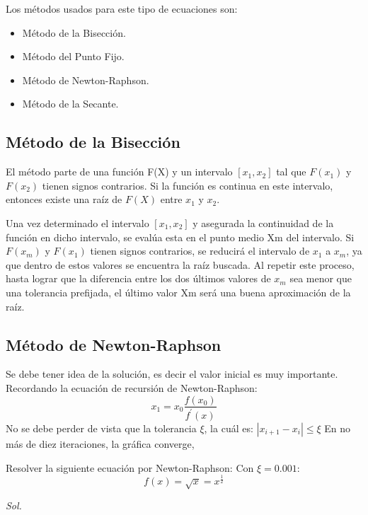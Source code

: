 Los métodos usados para este tipo de ecuaciones son:
\begin{itemize}
    \item Método de la Bisección.
    \item Método del Punto Fijo.
    \item Método de Newton-Raphson.
    \item Método de la Secante.
\end{itemize}

\subsection{Método de la Bisección}
El método parte de una función F(X) y un intervalo $[x_1,x_2]$ tal que $F(x_1)$ y $F(x_2)$ tienen signos contrarios. Si la función es continua en este intervalo, entonces existe una raíz de $F(X)$ entre $x_1$ y $x_2$.

Una vez determinado el intervalo $[x_1,x_2]$ y asegurada la continuidad de la función en dicho intervalo, se evalúa esta en el punto medio Xm del intervalo. Si $F(x_m)$ y $F(x_1)$ tienen signos contrarios, se reducirá el intervalo de $x_1$ a $x_m$, ya que dentro de estos valores se encuentra la raíz buscada. Al repetir este proceso, hasta lograr que la diferencia entre los dos últimos valores de $x_m$ sea menor que una tolerancia prefijada, el último valor Xm será una buena aproximación de la raíz.


\subsection{Método de Newton-Raphson}
Se debe tener idea de la solución, es decir el valor inicial es muy importante.
Recordando la ecuación de recursión de Newton-Raphson:
\begin{equation}
    x_1= x_0\frac{f(x_0)}{f^{\prime}(x)}
\end{equation}
No se debe perder de vista que la tolerancia $\xi$, la cuál es: $\left\lvert x_{i+1}-x_i \right\rvert  \leq \xi$
En no más de diez iteraciones, la gráfica converge,
\begin{example}
    Resolver la siguiente ecuación por Newton-Raphson:
    Con $\xi=0.001$:
    \begin{equation*}
        f(x)= \sqrt{x}=x^{\frac{1}{2}}
    \end{equation*}
\end{example}

\textit{ Sol. }

